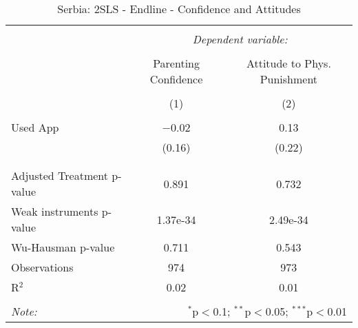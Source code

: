 
\begin{table}[!htbp] \centering 
  \caption{Serbia: 2SLS - Endline - Confidence and Attitudes} 
  \label{tbl:Serbia: 2SLS - Endline - Confidence and Attitudes} 
\begin{tabular}{@{\extracolsep{5pt}}lcc} 
\\[-1.8ex]\hline 
\hline \\[-1.8ex] 
 & \multicolumn{2}{c}{\textit{Dependent variable:}} \\ 
\cline{2-3} 
\\[-1.8ex] & Parenting Confidence & Attitude to Phys. Punishment \\ 
\\[-1.8ex] & (1) & (2)\\ 
\hline \\[-1.8ex] 
 Used App & $-$0.02 & 0.13 \\ 
  & (0.16) & (0.22) \\ 
  & & \\ 
\hline \\[-1.8ex] 
Adjusted Treatment p-value & 0.891 & 0.732 \\ 
Weak instruments p-value & 1.37e-34 & 2.49e-34 \\ 
Wu-Hausman p-value & 0.711 & 0.543 \\ 
Observations & 974 & 973 \\ 
R$^{2}$ & 0.02 & 0.01 \\ 
\hline 
\hline \\[-1.8ex] 
\textit{Note:}  & \multicolumn{2}{r}{$^{*}$p$<$0.1; $^{**}$p$<$0.05; $^{***}$p$<$0.01} \\ 
\end{tabular} 
\end{table} 
